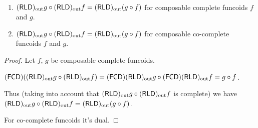 \begin{thm}
~
\begin{enumerate}
\item $\torldout g\circ\torldout f=\torldout(g\circ f)$ for composable
complete funcoids $f$ and $g$.
\item $\torldout g\circ\torldout f=\torldout(g\circ f)$ for composable
co-complete funcoids $f$ and $g$.
\end{enumerate}
\end{thm}
\begin{proof}
Let $f$, $g$ be composable complete funcoids.

$\tofcd(\torldout g\circ\torldout f)=\tofcd\torldout g\circ\tofcd\torldout f=g\circ f$.

Thus (taking into account that $\torldout g\circ\torldout f$ is complete)
we have $\torldout g\circ\torldout f=\torldout(g\circ f)$.

For co-complete funcoids it's dual.\end{proof}

